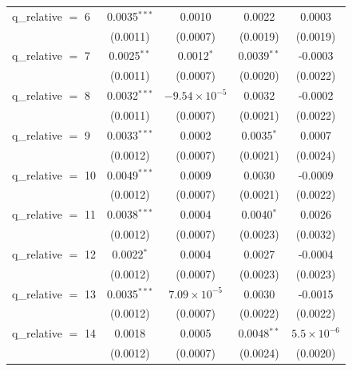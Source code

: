 \begin{tabular}{lcccc}
   q\_relative $=$ 6    & 0.0035$^{***}$        & 0.0010                 & 0.0022        & 0.0003\\   
                        & (0.0011)              & (0.0007)               & (0.0019)      & (0.0019)\\   
   q\_relative $=$ 7    & 0.0025$^{**}$         & 0.0012$^{*}$           & 0.0039$^{**}$ & -0.0003\\   
                        & (0.0011)              & (0.0007)               & (0.0020)      & (0.0022)\\   
   q\_relative $=$ 8    & 0.0032$^{***}$        & $-9.54\times 10^{-5}$  & 0.0032        & -0.0002\\   
                        & (0.0011)              & (0.0007)               & (0.0021)      & (0.0022)\\   
   q\_relative $=$ 9    & 0.0033$^{***}$        & 0.0002                 & 0.0035$^{*}$  & 0.0007\\   
                        & (0.0012)              & (0.0007)               & (0.0021)      & (0.0024)\\   
   q\_relative $=$ 10   & 0.0049$^{***}$        & 0.0009                 & 0.0030        & -0.0009\\   
                        & (0.0012)              & (0.0007)               & (0.0021)      & (0.0022)\\   
   q\_relative $=$ 11   & 0.0038$^{***}$        & 0.0004                 & 0.0040$^{*}$  & 0.0026\\   
                        & (0.0012)              & (0.0007)               & (0.0023)      & (0.0032)\\   
   q\_relative $=$ 12   & 0.0022$^{*}$          & 0.0004                 & 0.0027        & -0.0004\\   
                        & (0.0012)              & (0.0007)               & (0.0023)      & (0.0023)\\   
   q\_relative $=$ 13   & 0.0035$^{***}$        & $7.09\times 10^{-5}$   & 0.0030        & -0.0015\\   
                        & (0.0012)              & (0.0007)               & (0.0022)      & (0.0022)\\   
   q\_relative $=$ 14   & 0.0018                & 0.0005                 & 0.0048$^{**}$ & $5.5\times 10^{-6}$\\    
                        & (0.0012)              & (0.0007)               & (0.0024)      & (0.0020)\\   

\end{tabular}

